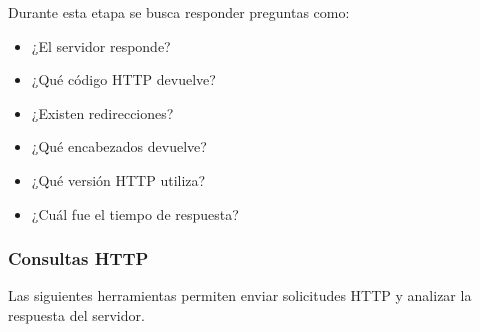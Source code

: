 \documentclass[a4paper,10pt]{article}
\begin{document}
Durante esta etapa se busca responder preguntas como:

\begin{itemize}
\item ¿El servidor responde?
\item ¿Qué código HTTP devuelve?
\item ¿Existen redirecciones?
\item ¿Qué encabezados devuelve?
\item ¿Qué versión HTTP utiliza?
\item ¿Cuál fue el tiempo de respuesta?
\end{itemize}


\subsubsection{Consultas HTTP}

Las siguientes herramientas permiten enviar solicitudes HTTP y analizar la
respuesta del servidor.
\end{document}
